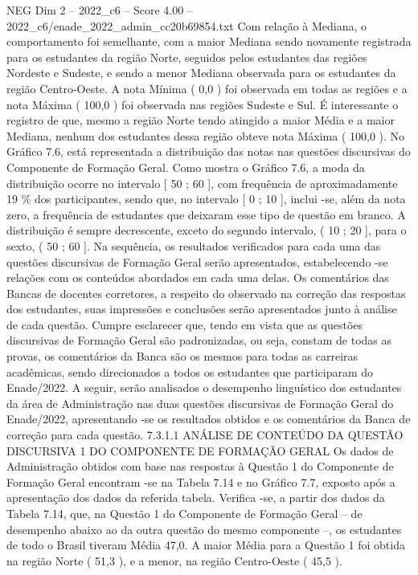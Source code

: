 \begin{textsample}{NEG Dim 2 – 2022\_c6 – Score 4.00 – 2022\_c6/enade\_2022\_admin\_cc20b69854.txt}
Com relação à Mediana, o comportamento foi semelhante, com a maior Mediana sendo novamente registrada para os estudantes da região Norte, seguidos pelos estudantes das regiões Nordeste e Sudeste, e sendo a menor Mediana observada para os estudantes da região Centro-Oeste.
A nota Mínima ( 0,0 ) foi observada em todas as regiões e a nota Máxima ( 100,0 ) foi observada nas regiões Sudeste e Sul.
É interessante o registro de que, mesmo a região Norte tendo atingido a maior Média e a maior Mediana, nenhum dos estudantes dessa região obteve nota Máxima ( 100,0 ).
No Gráfico 7.6, está representada a distribuição das notas nas questões discursivas do Componente de Formação Geral.
Como mostra o Gráfico 7.6, a moda da distribuição ocorre no intervalo [ 50 ; 60 ], com frequência de aproximadamente 19 \% dos participantes, sendo que, no intervalo [ 0 ; 10 ], inclui -se, além da nota zero, a frequência de estudantes que deixaram esse tipo de questão em branco.
A distribuição é sempre decrescente, exceto do segundo intervalo, ( 10 ; 20 ], para o sexto, ( 50 ; 60 ].
Na sequência, os resultados verificados para cada uma das questões discursivas de Formação Geral serão apresentados, estabelecendo -se relações com os conteúdos abordados em cada uma delas.
Os comentários das Bancas de docentes corretores, a respeito do observado na correção das respostas dos estudantes, suas impressões e conclusões serão apresentados junto à análise de cada questão.
Cumpre esclarecer que, tendo em vista que as questões discursivas de Formação Geral são padronizadas, ou seja, constam de todas as provas, os comentários da Banca são os mesmos para todas as carreiras acadêmicas, sendo direcionados a todos os estudantes que participaram do Enade/2022.
A seguir, serão analisados o desempenho linguístico dos estudantes da área de Administração nas duas questões discursivas de Formação Geral do Enade/2022, apresentando -se os resultados obtidos e os comentários da Banca de correção para cada questão. 7.3.1.1 ANÁLISE DE CONTEÚDO DA QUESTÃO DISCURSIVA 1 DO COMPONENTE DE FORMAÇÃO GERAL Os dados de Administração obtidos com base nas respostas à Questão 1 do Componente de Formação Geral encontram -se na Tabela 7.14 e no Gráfico 7.7, exposto após a apresentação dos dados da referida tabela.
Verifica -se, a partir dos dados da Tabela 7.14, que, na Questão 1 do Componente de Formação Geral – de desempenho abaixo ao da outra questão do mesmo componente –, os estudantes de todo o Brasil tiveram Média 47,0.
A maior Média para a Questão 1 foi obtida na região Norte ( 51,3 ), e a menor, na região Centro-Oeste ( 45,5 ).

\end{textsample}
